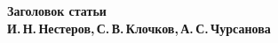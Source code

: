 \documentclass[10pt,a4paper,oneside]{article}
\begin{document}
 
\begin{center}
    \textbf{\LARGE Заголовок статьи} \\[1em]
    \textbf{И.\,Н.\,Нестеров,\,С.\,В.\,Клочков,\,А.\,С.\,Чурсанова} \\[2em]
\end{center}







  
 
\end{document}
